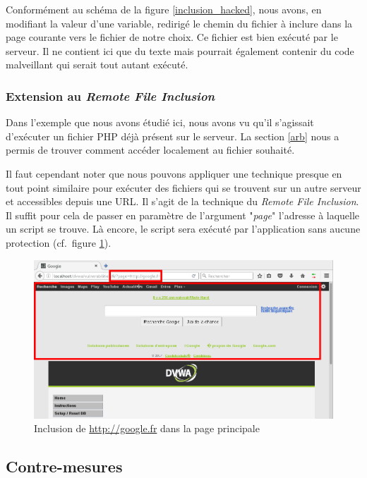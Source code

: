 Conformément au schéma de la figure \ref{inclusion_hacked}, nous avons, en modifiant la valeur d'une variable, redirigé le chemin du fichier à inclure dans la page courante vers le fichier de notre choix. Ce fichier  est bien exécuté par le serveur. Il ne contient ici que du texte mais pourrait également contenir du code malveillant qui serait tout autant exécuté.

\subsubsection{Extension au \textit{Remote File Inclusion}}

Dans l'exemple que nous avons étudié ici, nous avons vu qu'il s'agissait d'exécuter un fichier PHP déjà présent sur le serveur. La section \ref{arb} nous a permis de trouver comment accéder localement au fichier souhaité.

Il faut cependant noter que nous pouvons appliquer une technique presque en tout point similaire pour exécuter des fichiers qui se trouvent sur un autre serveur et accessibles depuis une URL. Il s'agit de la technique du \textit{Remote File Inclusion}. Il suffit pour cela de passer en paramètre de l'argument "\textit{page}" l'adresse à laquelle un script se trouve. Là encore, le script sera exécuté par l'application sans aucune protection (cf.\ figure \ref{fi_dvwa5}).

\begin{figure}[!h]
\begin{center}
\includegraphics[scale=.45]{images/fi5.png}

\caption{Inclusion de \url{http://google.fr} dans la page principale}
\label{fi_dvwa5}
\end{center}
\end{figure}

\subsection{Contre-mesures}

